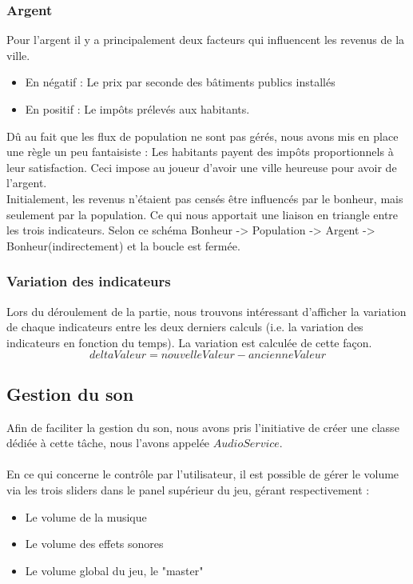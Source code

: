 \documentclass[a4paper,10pt,openany,oneside]{report}
\begin{document}
\subsubsection{Argent}
Pour l'argent il y a principalement deux facteurs qui influencent les revenus de la ville.
\begin{itemize}
	\item En négatif : Le prix par seconde des bâtiments publics installés
	\item En positif : Le impôts prélevés aux habitants.
\end{itemize}
Dû au fait que les flux de population ne sont pas gérés, nous avons mis en place une règle un peu fantaisiste : Les habitants payent des impôts proportionnels à leur satisfaction. Ceci impose au joueur d'avoir une ville heureuse pour avoir de l'argent.\\
Initialement, les revenus n'étaient pas censés être influencés par le bonheur, mais seulement par la population. Ce qui nous apportait une liaison en triangle entre les trois indicateurs.
Selon ce schéma Bonheur -> Population -> Argent -> Bonheur(indirectement) et la boucle est fermée.

\subsubsection{Variation des indicateurs}
Lors du déroulement de la partie, nous trouvons intéressant d'afficher la variation de chaque indicateurs entre les deux derniers calculs (i.e. la variation des indicateurs en fonction du temps). La variation est calculée de cette façon. \[deltaValeur = nouvelleValeur - ancienneValeur\]

\subsection{Gestion du son}
Afin de faciliter la gestion du son, nous avons pris l'initiative de créer une classe dédiée à cette tâche, nous l'avons appelée $AudioService$.
\paragraph{}
En ce qui concerne le contrôle par l'utilisateur, il est possible de gérer le volume via les trois sliders dans le panel supérieur du jeu, gérant respectivement :
\begin{itemize}
\item Le volume de la musique
\item Le volume des effets sonores
\item Le volume global du jeu, le "master"
\end{itemize}
\end{document}
